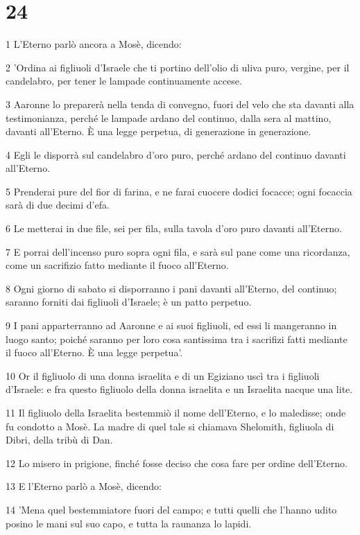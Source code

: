 \chapter{24}

\par 1 L'Eterno parlò ancora a Mosè, dicendo:
\par 2 'Ordina ai figliuoli d'Israele che ti portino dell'olio di uliva puro, vergine, per il candelabro, per tener le lampade continuamente accese.
\par 3 Aaronne lo preparerà nella tenda di convegno, fuori del velo che sta davanti alla testimonianza, perché le lampade ardano del continuo, dalla sera al mattino, davanti all'Eterno. È una legge perpetua, di generazione in generazione.
\par 4 Egli le disporrà sul candelabro d'oro puro, perché ardano del continuo davanti all'Eterno.
\par 5 Prenderai pure del fior di farina, e ne farai cuocere dodici focacce; ogni focaccia sarà di due decimi d'efa.
\par 6 Le metterai in due file, sei per fila, sulla tavola d'oro puro davanti all'Eterno.
\par 7 E porrai dell'incenso puro sopra ogni fila, e sarà sul pane come una ricordanza, come un sacrifizio fatto mediante il fuoco all'Eterno.
\par 8 Ogni giorno di sabato si disporranno i pani davanti all'Eterno, del continuo; saranno forniti dai figliuoli d'Israele; è un patto perpetuo.
\par 9 I pani apparterranno ad Aaronne e ai suoi figliuoli, ed essi li mangeranno in luogo santo; poiché saranno per loro cosa santissima tra i sacrifizi fatti mediante il fuoco all'Eterno. È una legge perpetua'.
\par 10 Or il figliuolo di una donna israelita e di un Egiziano uscì tra i figliuoli d'Israele: e fra questo figliuolo della donna israelita e un Israelita nacque una lite.
\par 11 Il figliuolo della Israelita bestemmiò il nome dell'Eterno, e lo maledisse; onde fu condotto a Mosè. La madre di quel tale si chiamava Shelomith, figliuola di Dibri, della tribù di Dan.
\par 12 Lo misero in prigione, finché fosse deciso che cosa fare per ordine dell'Eterno.
\par 13 E l'Eterno parlò a Mosè, dicendo:
\par 14 'Mena quel bestemmiatore fuori del campo; e tutti quelli che l'hanno udito posino le mani sul suo capo, e tutta la raunanza lo lapidi.
